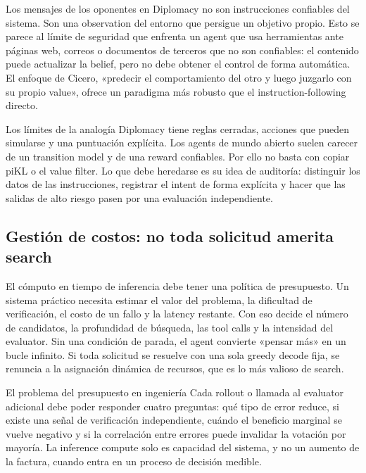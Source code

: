 Los mensajes de los oponentes en Diplomacy no son instrucciones confiables del sistema. Son una observation del entorno que persigue un objetivo propio. Esto se parece al límite de seguridad que enfrenta un agent que usa herramientas ante páginas web, correos o documentos de terceros que no son confiables: el contenido puede actualizar la belief, pero no debe obtener el control de forma automática. El enfoque de Cicero, «predecir el comportamiento del otro y luego juzgarlo con su propio value», ofrece un paradigma más robusto que el instruction-following directo.

\begin{warningbox}{Los límites de la analogía}
Diplomacy tiene reglas cerradas, acciones que pueden simularse y una puntuación explícita. Los agents de mundo abierto suelen carecer de un transition model y de una reward confiables. Por ello no basta con copiar piKL o el value filter. Lo que debe heredarse es su idea de auditoría: distinguir los datos de las instrucciones, registrar el intent de forma explícita y hacer que las salidas de alto riesgo pasen por una evaluación independiente.
\end{warningbox}

\subsection{Gestión de costos: no toda solicitud amerita search}

El cómputo en tiempo de inferencia debe tener una política de presupuesto. Un sistema práctico necesita estimar el valor del problema, la dificultad de verificación, el costo de un fallo y la latency restante. Con eso decide el número de candidatos, la profundidad de búsqueda, las tool calls y la intensidad del evaluator. Sin una condición de parada, el agent convierte «pensar más» en un bucle infinito. Si toda solicitud se resuelve con una sola greedy decode fija, se renuncia a la asignación dinámica de recursos, que es lo más valioso de search.

\begin{importantbox}{El problema del presupuesto en ingeniería}
Cada rollout o llamada al evaluator adicional debe poder responder cuatro preguntas: qué tipo de error reduce, si existe una señal de verificación independiente, cuándo el beneficio marginal se vuelve negativo y si la correlación entre errores puede invalidar la votación por mayoría. La inference compute solo es capacidad del sistema, y no un aumento de la factura, cuando entra en un proceso de decisión medible.
\end{importantbox}

